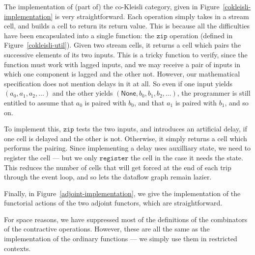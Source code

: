 \documentclass[nocopyrightspace,preprint]{sigplanconf}
\newcommand{\term}[1]{\ensuremath{\mathtt{{#1}}}}
\newcommand{\None}{\mathsf{None}}
\begin{document}
The implementation of (part of) the co-Kleisli category, given in
Figure~\ref{cokleisli-implementation} is very straightforward. Each
operation simply takes in a stream cell, and builds a cell to return
its return value. This is because all the difficulties have been
encapsulated into a single function: the \term{zip} operation (defined
in Figure~\ref{cokleisli-util}). Given two stream cells, it returns a
cell which pairs the successive elements of its two inputs. This is a
tricky function to verify, since the function must work with lagged
inputs, and we may receive a pair of inputs in which one component is
lagged and the other not. However, our mathematical specification does
not mention delays in it at all. So even if one input yields $(a_0,
a_1, a_2, \ldots)$ and the other yields $(\None, b_0, b_1, b_2,
\ldots)$, the programmer is still entitled to assume that $a_0$ is
paired with $b_0$, and that $a_1$ is paired with $b_1$, and so on.

To implement this, \term{zip} tests the two inputs, and introduces an
artificial delay, if one cell is delayed and the other is not.
Otherwise, it simply returns a cell which performs the pairing. Since
implementing a delay uses auxilliary state, we need to register the
cell --- but we only \term{register} the cell in the case it needs the
state. This reduces the number of cells that will get forced at the
end of each trip through the event loop, and so lets the dataflow
graph remain lazier.

Finally, in Figure~\ref{adjoint-implementation}, we give the
implementation of the functorial actions of the two adjoint functors,
which are straightforward. 

For space reasons, we have suppressed most of the definitions of the
combinators of the contractive operations. However, these are all 
the same as the implementation of the ordinary functions --- we simply
use them in restricted contexts.
\end{document}

